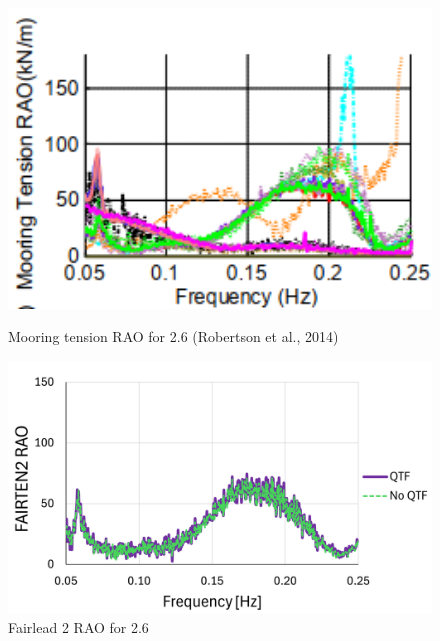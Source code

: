 \documentclass[a4paper, 11pt]{article}
\begin{document}
\begin{figure}[H]
    \begin{minipage}{0.48\textwidth}
        \centering
        \includegraphics[width=1\textwidth]{2.6_ten.png}
        \caption{\small Mooring tension RAO for 2.6 (Robertson et al., 2014)}
        \label{fig:2.6_fairten2}
    \end{minipage}
    \hfill
    \begin{minipage}{0.5\textwidth}
        \centering
        \vspace{0.4cm}
        \includegraphics[width=1\textwidth]{2.6_ten_mine.png}
        \caption{\small Fairlead 2 RAO for 2.6}
        \label{fig:2.6_fairten2_mine}
    \end{minipage}
\end{figure}
\end{document}
